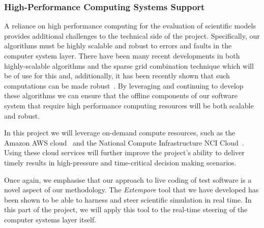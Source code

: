 \subsubsection*{High-Performance Computing Systems Support}

A reliance on high performance computing for the evaluation of
scientific models provides additional challenges to the technical side
of the project. Specifically, our algorithms must be highly scalable
and robust to errors and faults in the computer system layer. There
have been many recent developments in both highly-scalable algorithms
and the sparse grid combination technique \cite{sgctalg15,pdsec15extsgctalg} 
which will be of use for
this and, additionally, it has been recently shown that such
computations can be made
robust~\parencite{HardingHLS2015,AliEtal2015,Ali11022016}. By leveraging and
continuing to develop these algorithms we can ensure that the
offline components of our software system that require high performance
computing resources will be both scalable and robust.

In this project we will leverage on-demand compute resources, such as
the Amazon AWS cloud~\parencite{amazonAws} and the National Compute
Infrastructure NCI Cloud~\parencite{nciCloud}. Using these cloud
services will further improve the project's ability to deliver timely
results in high-pressure and time-critical decision making scenarios.

Once again, we emphasise that our approach to live coding of test
software is a novel aspect of our methodology. The \emph{Extempore}
tool that we have developed has been shown to be able to harness and
steer scientific simulation in real time. In this part of the project,
we will apply this tool to the real-time steering of the computer
systems layer itself.


